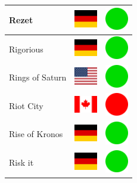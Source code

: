 \documentclass[12pt, a4paper, twoside]{report}
\begin{document}
\begin{center}
\begin{longtable}{|p{5cm}|p{2cm}|p{2cm}|}
 Rezet                                                      & \includegraphics[width=1cm]{../4x3/de} &   \includegraphics[width=1cm]{../likes/y} \\ \hline
 Rigorious                                                  & \includegraphics[width=1cm]{../4x3/de} &   \includegraphics[width=1cm]{../likes/y} \\ \hline
 Rings of Saturn                                            & \includegraphics[width=1cm]{../4x3/us} &   \includegraphics[width=1cm]{../likes/y} \\ \hline
 Riot City                                                  & \includegraphics[width=1cm]{../4x3/ca} &   \includegraphics[width=1cm]{../likes/n} \\ \hline
 Rise of Kronos                                             & \includegraphics[width=1cm]{../4x3/de} &   \includegraphics[width=1cm]{../likes/y} \\ \hline
 Risk it                                                    & \includegraphics[width=1cm]{../4x3/de} &   \includegraphics[width=1cm]{../likes/y} \\ \hline

\end{longtable}
\end{center}
\end{document}
